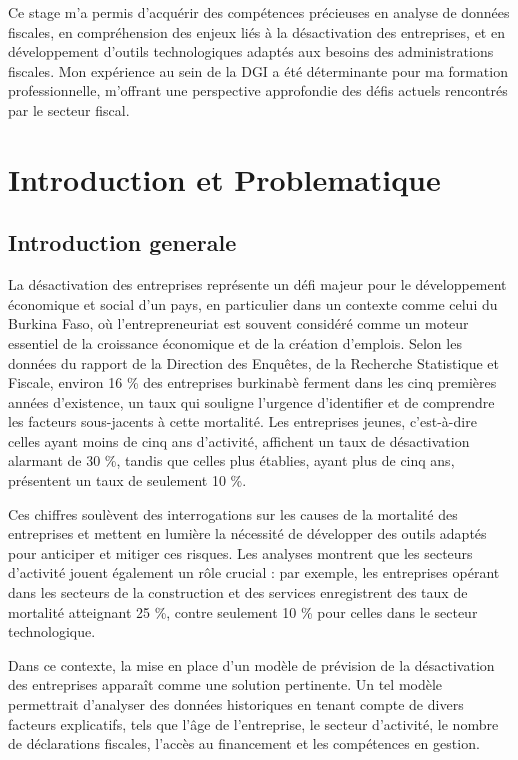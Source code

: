 \documentclass[a4paper,12pt]{report}
\begin{document}
Ce stage m'a permis d'acquérir des compétences précieuses en analyse de données fiscales, en compréhension des enjeux liés à la désactivation des entreprises, et en développement d'outils technologiques adaptés aux besoins des administrations fiscales. Mon expérience au sein de la DGI a été déterminante pour ma formation professionnelle, m'offrant une perspective approfondie des défis actuels rencontrés par le secteur fiscal.

\chapter{Introduction et Problematique}
\setcounter{section}{0}
\section{Introduction generale}
La désactivation des entreprises représente un défi majeur pour le développement économique et social d'un pays, en particulier dans un contexte comme celui du Burkina Faso, où l'entrepreneuriat est souvent considéré comme un moteur essentiel de la croissance économique et de la création d'emplois. Selon les données du rapport de la Direction des Enquêtes, de la Recherche Statistique et Fiscale, environ 16 \% des entreprises burkinabè ferment dans les cinq premières années d'existence, un taux qui souligne l'urgence d'identifier et de comprendre les facteurs sous-jacents à cette mortalité. Les entreprises jeunes, c'est-à-dire celles ayant moins de cinq ans d'activité, affichent un taux de désactivation alarmant de 30 \%, tandis que celles plus établies, ayant plus de cinq ans, présentent un taux de seulement 10 \%.

Ces chiffres soulèvent des interrogations sur les causes de la mortalité des entreprises et mettent en lumière la nécessité de développer des outils adaptés pour anticiper et mitiger ces risques. Les analyses montrent que les secteurs d'activité jouent également un rôle crucial : par exemple, les entreprises opérant dans les secteurs de la construction et des services enregistrent des taux de mortalité atteignant 25 \%, contre seulement 10 \% pour celles dans le secteur technologique.

Dans ce contexte, la mise en place d'un modèle de prévision de la désactivation des entreprises apparaît comme une solution pertinente. Un tel modèle permettrait d'analyser des données historiques en tenant compte de divers facteurs explicatifs, tels que l'âge de l'entreprise, le secteur d'activité, le nombre de déclarations fiscales, l'accès au financement et les compétences en gestion.
\end{document}
